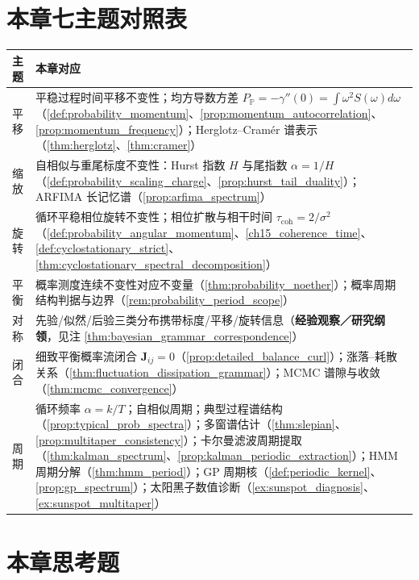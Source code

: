 \section*{本章七主题对照表}

\begin{center}
\renewcommand{\arraystretch}{1.3}
\begin{tabular}{>{\centering\arraybackslash}p{2.2cm}>{\centering\arraybackslash}p{10.5cm}}
\toprule
主题 & 本章对应 \\
\midrule
平移 & 平稳过程时间平移不变性；均方导数方差 $P_{\mathbb P}=-\gamma''(0)=\int\omega^2S(\omega)d\omega$（\cref{def:probability_momentum}、\cref{prop:momentum_autocorrelation}、\cref{prop:momentum_frequency}）；Herglotz--Cramér 谱表示（\cref{thm:herglotz}、\cref{thm:cramer}） \\
缩放 & 自相似与重尾标度不变性：Hurst 指数 $H$ 与尾指数 $\alpha=1/H$（\cref{def:probability_scaling_charge}、\cref{prop:hurst_tail_duality}）；ARFIMA 长记忆谱（\cref{prop:arfima_spectrum}） \\
旋转 & 循环平稳相位旋转不变性；相位扩散与相干时间 $\tau_{\mathrm{coh}}=2/\sigma^2$（\cref{def:probability_angular_momentum}、\cref{ch15_coherence_time}、\cref{def:cyclostationary_strict}、\cref{thm:cyclostationary_spectral_decomposition}） \\
平衡 & 概率测度连续不变性对应不变量（\cref{thm:probability_noether}）；概率周期结构判据与边界（\cref{rem:probability_period_scope}） \\
对称 & 先验/似然/后验三类分布携带标度/平移/旋转信息（\textbf{经验观察／研究纲领}，见注 \cref{thm:bayesian_grammar_correspondence}） \\
闭合 & 细致平衡概率流闭合 $\mathbf J_{ij}=0$（\cref{prop:detailed_balance_curl}）；涨落--耗散关系（\cref{thm:fluctuation_dissipation_grammar}）；MCMC 谱隙与收敛（\cref{thm:mcmc_convergence}） \\
周期 & 循环频率 $\alpha=k/T$；自相似周期；典型过程谱结构（\cref{prop:typical_prob_spectra}）；多窗谱估计（\cref{thm:slepian}、\cref{prop:multitaper_consistency}）；卡尔曼滤波周期提取（\cref{thm:kalman_spectrum}、\cref{prop:kalman_periodic_extraction}）；HMM 周期分解（\cref{thm:hmm_period}）；GP 周期核（\cref{def:periodic_kernel}、\cref{prop:gp_spectrum}）；太阳黑子数值诊断（\cref{ex:sunspot_diagnosis}、\cref{ex:sunspot_multitaper}） \\
\bottomrule
\end{tabular}
\end{center}

\section*{本章思考题}

